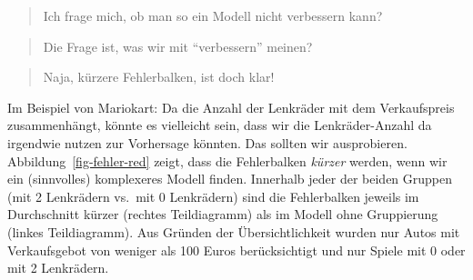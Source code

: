 \documentclass[
  letterpaper,
  twoside,
  open=any]{scrbook}
\theoremstyle{definition}
\theoremstyle{definition}
\theoremstyle{definition}
\theoremstyle{remark}
\begin{document}
\begin{quote}
{} Ich frage mich, ob man so ein Modell nicht verbessern
kann?
\end{quote}

\begin{quote}
{} Die Frage ist, was wir mit \enquote{verbessern}
meinen?
\end{quote}

\begin{quote}
{} Naja, kürzere Fehlerbalken, ist doch klar!
\end{quote}

Im Beispiel von Mariokart: Da die Anzahl der Lenkräder mit dem
Verkaufspreis zusammenhängt, könnte es vielleicht sein, dass wir die
Lenkräder-Anzahl da irgendwie nutzen zur Vorhersage könnten. Das sollten
wir ausprobieren. Abbildung~\ref{fig-fehler-red} zeigt, dass die
Fehlerbalken \emph{kürzer} werden, wenn wir ein (sinnvolles) komplexeres
Modell finden. Innerhalb jeder der beiden Gruppen (mit 2 Lenkrädern
vs.~mit 0 Lenkrädern) sind die Fehlerbalken jeweils im Durchschnitt
kürzer (rechtes Teildiagramm) als im Modell ohne Gruppierung (linkes
Teildiagramm). Aus Gründen der Übersichtlichkeit wurden nur Autos mit
Verkaufsgebot von weniger als 100 Euros berücksichtigt und nur Spiele
mit 0 oder mit 2 Lenkrädern.
\end{document}

